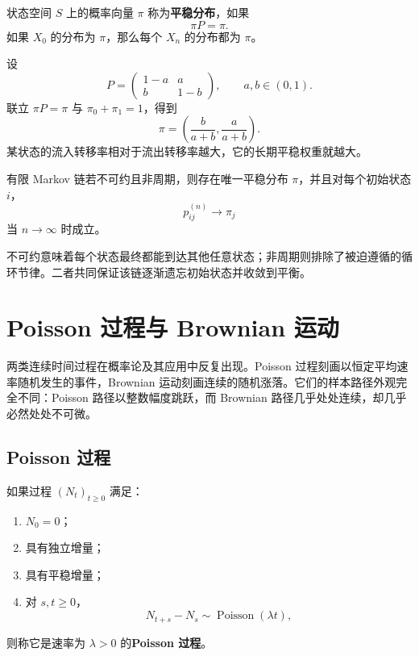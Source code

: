 \begin{definition}[平稳分布]
状态空间 $S$ 上的概率向量 $\pi$ 称为\textbf{平稳分布}，如果
\[
    \pi P=\pi.
\]
如果 $X_0$ 的分布为 $\pi$，那么每个 $X_n$ 的分布都为 $\pi$。
\end{definition}

\begin{example}[两状态链]
设
\[
P=
\begin{pmatrix}
1-a&a\\
b&1-b
\end{pmatrix},
\qquad a,b\in(0,1).
\]
联立 $\pi P=\pi$ 与 $\pi_0+\pi_1=1$，得到
\[
    \pi=\left(\frac{b}{a+b},\frac{a}{a+b}\right).
\]
某状态的流入转移率相对于流出转移率越大，它的长期平稳权重就越大。
\end{example}

\begin{theorem}[有限不可约非周期链]
有限 Markov 链若不可约且非周期，则存在唯一平稳分布 $\pi$，并且对每个初始状态 $i$，
\[
    p_{ij}^{(n)}\to\pi_j
\]
当 $n\to\infty$ 时成立。
\end{theorem}

\begin{remark}
不可约意味着每个状态最终都能到达其他任意状态；非周期则排除了被迫遵循的循环节律。二者共同保证该链逐渐遗忘初始状态并收敛到平衡。
\end{remark}

\section{Poisson 过程与 Brownian 运动}

两类连续时间过程在概率论及其应用中反复出现。Poisson 过程刻画以恒定平均速率随机发生的事件，Brownian 运动刻画连续的随机涨落。它们的样本路径外观完全不同：Poisson 路径以整数幅度跳跃，而 Brownian 路径几乎处处连续，却几乎必然处处不可微。

\subsection{Poisson 过程}

\begin{definition}[Poisson 过程]
如果过程 $(N_t)_{t\geq0}$ 满足：
\begin{enumerate}
    \item $N_0=0$；
    \item 具有独立增量；
    \item 具有平稳增量；
    \item 对 $s,t\geq0$，
    \[
        N_{t+s}-N_s\sim\operatorname{Poisson}(\lambda t),
    \]
\end{enumerate}
则称它是速率为 $\lambda>0$ 的\textbf{Poisson 过程}。
\end{definition}

